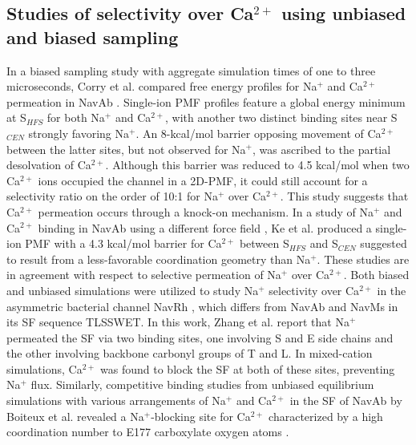 \begin{refsection}
 
 \subsection{Studies of selectivity over Ca$^{2+}$ using unbiased and biased sampling}
 In a biased sampling study with aggregate simulation times of one to three microseconds, Corry et al. compared free energy profiles for Na$^{+}$ and Ca$^{2+}$ permeation in NavAb \cite{Corry:2013hg}.  Single-ion PMF profiles feature a global energy minimum at S$_{HFS}$ for both Na$^{+}$ and Ca$^{2+}$, with another two distinct binding sites near S$_{CEN}$ strongly favoring Na$^{+}$.  An 8-kcal/mol barrier opposing movement of Ca$^{2+}$ between the latter sites, but not observed for Na$^{+}$, was ascribed to the partial desolvation of Ca$^{2+}$.  Although this barrier was reduced to 4.5 kcal/mol when two Ca$^{2+}$ ions occupied the channel in a 2D-PMF, it could still account for a selectivity ratio on the order of 10:1 for Na$^{+}$ over Ca$^{2+}$.  This study suggests that Ca$^{2+}$ permeation occurs through a knock-on mechanism.  In a study of Na$^{+}$ and Ca$^{2+}$ binding in NavAb using a different force field \cite{Ke:2013ub}, Ke et al. produced a single-ion PMF with a 4.3 kcal/mol barrier for Ca$^{2+}$ between S$_{HFS}$ and S$_{CEN}$ suggested to result from a less-favorable coordination geometry than Na$^{+}$.  These studies are in agreement with respect to selective permeation of Na$^{+}$ over Ca$^{2+}$.
	Both biased and unbiased simulations were utilized to study Na$^{+}$ selectivity over Ca$^{2+}$ in the asymmetric bacterial channel NavRh \cite{Zhang:2013bz,Zhang:2013vc}, which differs from NavAb and NavMs in its SF sequence TLSSWET.  In this work, Zhang et al. report that Na$^{+}$ permeated the SF via two binding sites, one involving S and E side chains and the other involving backbone carbonyl groups of T and L.  In mixed-cation simulations, Ca$^{2+}$ was found to block the SF at both of these sites, preventing Na$^{+}$ flux.  Similarly, competitive binding studies from unbiased equilibrium simulations with various arrangements of Na$^{+}$ and Ca$^{2+}$ in the SF of NavAb by Boiteux et al. revealed a Na$^{+}$-blocking site for Ca$^{2+}$ characterized by a high coordination number to E177 carboxylate oxygen atoms \cite{Boiteux:2014ut}.
 

\end{refsection}
